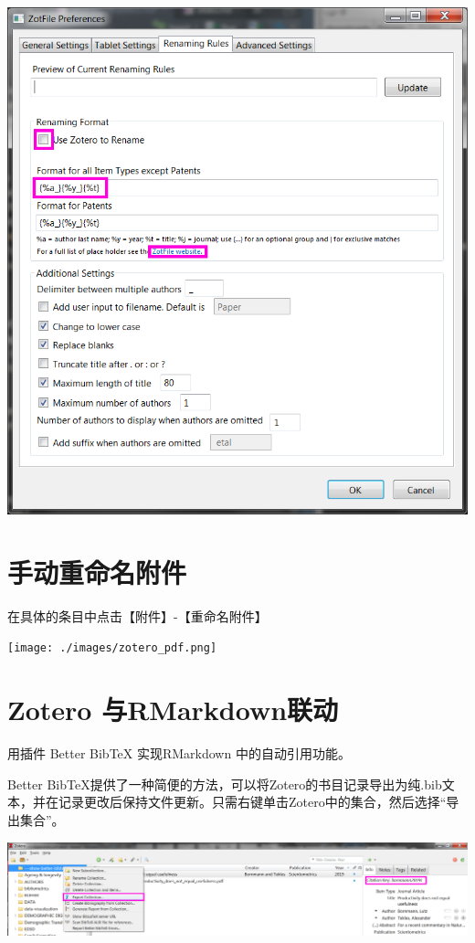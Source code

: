 \documentclass[
  letterpaper,
  DIV=11,
  numbers=noendperiod,
  oneside]{scrreprt}
\begin{document}
\includegraphics{./images/zotero_rename.png}

\hypertarget{ux624bux52a8ux91cdux547dux540dux9644ux4ef6}{%
\section{手动重命名附件}\label{ux624bux52a8ux91cdux547dux540dux9644ux4ef6}}

在具体的条目中点击【附件】-【重命名附件】

\texttt{[image: ./images/zotero\_pdf.png]}

\hypertarget{zotero-ux4e0ermarkdownux8054ux52a8}{%
\section{Zotero
与RMarkdown联动}\label{zotero-ux4e0ermarkdownux8054ux52a8}}

用插件 Better BibTeX 实现RMarkdown 中的自动引用功能。

Better
BibTeX提供了一种简便的方法，可以将Zotero的书目记录导出为纯.bib文本，并在记录更改后保持文件更新。只需右键单击Zotero中的集合，然后选择``导出集合''。

\includegraphics{./images/zotero_bbt.png}
\end{document}
